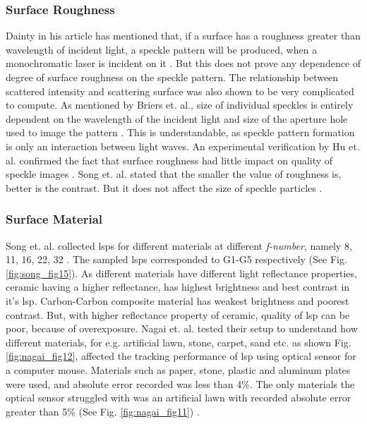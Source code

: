     \subsubsection*{Surface Roughness}
    Dainty in his article has mentioned that, if a surface has a roughness greater than wavelength of incident light, a speckle pattern will be produced, when a monochromatic laser is incident on it \cite{dainty}. But this does not prove any dependence of degree of surface roughness on the speckle pattern. The relationship between scattered intensity and scattering surface was also shown to be very complicated to compute. As mentioned by Briers et. al., size of individual speckles is entirely dependent on the wavelength of the incident light and size of the aperture hole used to image the pattern \cite{briers}. This is understandable, as speckle pattern formation is only an interaction between light waves. An experimental verification by Hu et. al. confirmed the fact that surface roughness had little impact on quality of speckle images \cite{hu}. Song et. al. stated that the smaller the value of roughness is, better is the contrast. But it does not affect the size of speckle particles \cite{song}.
    

    \subsubsection*{Surface Material}
    Song et. al. collected \glspl{lsp} for different materials at different \emph{f-number}, namely 8, 11, 16, 22, 32 \cite{song}. The sampled \glspl{lsp} corresponded to G1-G5 respectively (See Fig. \ref{fig:song_fig15}). As different materials have different light reflectance properties, ceramic having a higher reflectance, has highest brightness and best contrast in it's \gls{lsp}. Carbon-Carbon composite material has weakest brightness and poorest contrast. But, with higher reflectance property of ceramic, quality of \Gls{lsp} can be poor, because of overexposure. Nagai et. al. tested their setup to understand how different materials, for e.g. artificial lawn, stone, carpet, sand etc. as shown Fig. \ref{fig:nagai_fig12}, affected the tracking performance of \gls{lsp} using optical sensor for a computer mouse. Materials such as paper, stone, plastic and aluminum plates were used, and absolute error recorded was less than 4\%. The only materials the optical sensor struggled with was an artificial lawn with recorded absolute error greater than 5\% (See Fig. \ref{fig:nagai_fig11}) \cite{nagai}.

